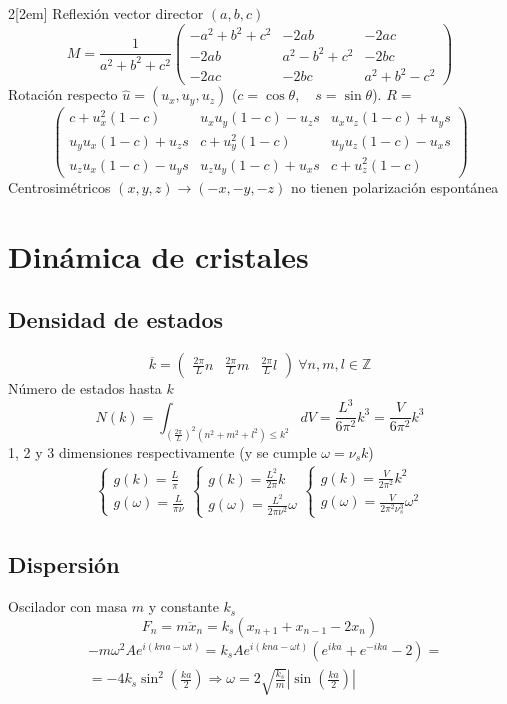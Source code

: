 \documentclass[leqno]{article}
\begin{document}
\begin{multicols}{2}[\columnsep2em]
Reflexión vector director $(a, b, c)$
 \[
   M = \frac{1}{a^2+b^2+c^2} \begin{pmatrix} -a^2 + b^2+c^2 & -2ab & -2ac \\ -2ab & a^2-b^2+c^2 & -2bc \\ -2ac & -2bc & a^2+b^2-c^2 \end{pmatrix} 
\] 
Rotación respecto $\hat{u}=(u_x, u_y, u_z)$ ($c=\cos\theta , \quad s=\sin \theta $). $R = $
\[
\begin{pmatrix} c+u_x^2(1-c) & u_xu_y(1-c)-u_zs & u_xu_z(1-c)+u_ys \\
	u_yu_x(1-c)+u_zs & c+u_y^2(1-c) & u_yu_z(1-c)-u_xs\\
	u_zu_x(1-c)-u_ys & u_zu_y(1-c) + u_xs & c + u_z^2(1-c)
  \end{pmatrix} 
\] 
Centrosimétricos $(x, y, z)\to (-x, -y, -z)$ no tienen polarización espontánea

\section{Dinámica de cristales}
\subsection{Densidad de estados}
\[
  \overline{k} = \begin{pmatrix} \frac{2\pi}{L}n & \frac{2\pi}{L}m & \frac{2\pi}{L}l \end{pmatrix} \ \forall n, m, l \in \mathbb{Z}
\] 
Número de estados hasta $k$
 \[
N(k) = \int_{(\frac{2\pi}{L})^2(n^2 + m^2+l^2)\le k^2} dV =\frac{L^3}{6\pi^2}k^3 = \frac{V}{6\pi^2}k^3
\] 
1, 2 y 3 dimensiones respectivamente (y se cumple $\omega = \nu_s k$)
\begin{align*}
  \begin{cases}
    g(k) = \frac{L}{\pi} \\  g(\omega ) = \frac{L}{\pi \nu} 
  \end{cases}
  \begin{cases}
    g(k) = \frac{L^2}{2\pi}k \\  g(\omega ) = \frac{L^2}{2\pi \nu^2}\omega 
  \end{cases}
  \begin{cases}
    g(k) = \frac{V}{2\pi^2}k^2 \\  g(\omega ) = \frac{V}{2\pi^2 \nu_s^3}\omega ^2
  \end{cases}
\end{align*}

\subsection{Dispersión}
Oscilador con masa $m$ y constante $k_s$
\[
F_n =m\ddot{x}_n = k_s(x_{n+1}+x_{n-1}-2x_n)
\]
\begin{align*}
   &-m\omega ^2 Ae^{i(kna-\omega t)} = k_sAe^{i(kna-\omega t)}(e^{ika}+e^{-ika}-2) =\\
   &=-4k_s \sin^2\left( \frac{ka}{2} \right)  \Rightarrow \boxed{\omega = 2 \sqrt{\frac{k_s}{m}}\left|\sin \left( \frac{ka}{2} \right) \right| }
\end{align*}


\end{multicols}
\end{document}
